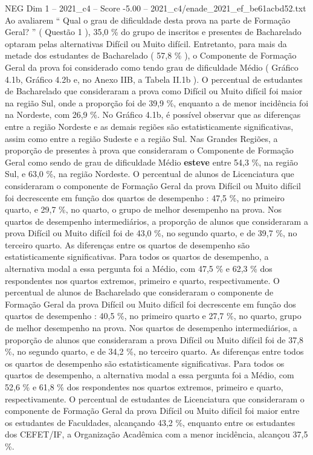 \begin{textsample}{NEG Dim 1 – 2021\_c4 – Score -5.00 – 2021\_c4/enade\_2021\_ef\_be61acbd52.txt}
Ao avaliarem “ Qual o grau de dificuldade desta prova na parte de Formação Geral? ” ( Questão 1 ), 35,0 \% do grupo de inscritos e presentes de Bacharelado optaram pelas alternativas Difícil ou Muito difícil.
Entretanto, para mais da metade dos estudantes de Bacharelado ( 57,8 \% ), o Componente de Formação Geral da prova foi considerado como tendo grau de dificuldade Médio ( Gráfico 4.1b, Gráfico 4.2b e, no Anexo IIB, a Tabela II.1b ).
O percentual de estudantes de Bacharelado que consideraram a prova como Difícil ou Muito difícil foi maior na região Sul, onde a proporção foi de 39,9 \%, enquanto a de menor incidência foi na Nordeste, com 26,9 \%.
No Gráfico 4.1b, é possível observar que as diferenças entre a região Nordeste e as demais regiões são estatisticamente significativas, assim como entre a região Sudeste e a região Sul.
Nas Grandes Regiões, a proporção de presentes à prova que consideraram o Componente de Formação Geral como sendo de grau de dificuldade Médio \textbf{esteve} entre 54,3 \%, na região Sul, e 63,0 \%, na região Nordeste.
O percentual de alunos de Licenciatura que consideraram o componente de Formação Geral da prova Difícil ou Muito difícil foi decrescente em função dos quartos de desempenho : 47,5 \%, no primeiro quarto, e 29,7 \%, no quarto, o grupo de melhor desempenho na prova.
Nos quartos de desempenho intermediários, a proporção de alunos que consideraram a prova Difícil ou Muito difícil foi de 43,0 \%, no segundo quarto, e de 39,7 \%, no terceiro quarto.
As diferenças entre os quartos de desempenho são estatisticamente significativas.
Para todos os quartos de desempenho, a alternativa modal a essa pergunta foi a Médio, com 47,5 \% e 62,3 \% dos respondentes nos quartos extremos, primeiro e quarto, respectivamente.
O percentual de alunos de Bacharelado que consideraram o componente de Formação Geral da prova Difícil ou Muito difícil foi decrescente em função dos quartos de desempenho : 40,5 \%, no primeiro quarto e 27,7 \%, no quarto, grupo de melhor desempenho na prova.
Nos quartos de desempenho intermediários, a proporção de alunos que consideraram a prova Difícil ou Muito difícil foi de 37,8 \%, no segundo quarto, e de 34,2 \%, no terceiro quarto.
As diferenças entre todos os quartos de desempenho são estatisticamente significativas.
Para todos os quartos de desempenho, a alternativa modal a essa pergunta foi a Médio, com 52,6 \% e 61,8 \% dos respondentes nos quartos extremos, primeiro e quarto, respectivamente.
O percentual de estudantes de Licenciatura que consideraram o componente de Formação Geral da prova Difícil ou Muito difícil foi maior entre os estudantes de Faculdades, alcançando 43,2 \%, enquanto entre os estudantes dos CEFET/IF, a Organização Acadêmica com a menor incidência, alcançou 37,5 \%.

\end{textsample}
